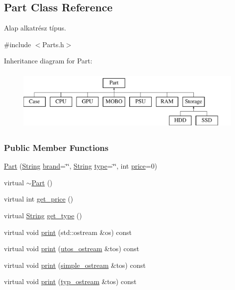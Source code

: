 \subsection{Part Class Reference}
\label{class_part}


Alap alkatrész típus.  




{\ttfamily \#include $<$Parts.\+h$>$}

Inheritance diagram for Part\+:\begin{figure}[H]
\begin{center}
\leavevmode
\includegraphics[height=3.000000cm]{class_part}
\end{center}
\end{figure}
\subsubsection*{Public Member Functions}
\begin{DoxyCompactItemize}
\item 
\mbox{\hyperlink{class_part_aae5224ee782134c4ecb60f23ec38698f}{Part}} (\mbox{\hyperlink{class_string}{String}} \mbox{\hyperlink{class_part_ae06f2fdeb7fbbdb229a7aca151f3e341}{brand}}=\char`\"{}\char`\"{}, \mbox{\hyperlink{class_string}{String}} \mbox{\hyperlink{class_part_a101dbcc5c4b21564df7414c7eb0eae88}{type}}=\char`\"{}\char`\"{}, int \mbox{\hyperlink{class_part_a8e71223aed1da95a974f33d8d6c91bb1}{price}}=0)
\item 
virtual \mbox{\hyperlink{class_part_aaecbb747a7227f7ce3b44caeaf1801c2}{$\sim$\+Part}} ()
\item 
virtual int \mbox{\hyperlink{class_part_a38bcd0481433acc24db7d5f978f2c839}{get\+\_\+price}} ()
\item 
virtual \mbox{\hyperlink{class_string}{String}} \mbox{\hyperlink{class_part_a02569fd3cf6c52b56baceed5d639f487}{get\+\_\+type}} ()
\item 
virtual void \mbox{\hyperlink{class_part_a4fa402b8e8fd4236ff773a7697ab2bc3}{print}} (std\+::ostream \&os) const
\item 
virtual void \mbox{\hyperlink{class_part_a9ecabe44ba3415badf82c6a23617a41e}{print}} (\mbox{\hyperlink{structutos__ostream}{utos\+\_\+ostream}} \&tos) const
\item 
virtual void \mbox{\hyperlink{class_part_aa602d876151b63db72cf8f666847a8cd}{print}} (\mbox{\hyperlink{structsimple__ostream}{simple\+\_\+ostream}} \&tos) const
\item 
virtual void \mbox{\hyperlink{class_part_ab6396030e8b7a724731a8b54bd4942fc}{print}} (\mbox{\hyperlink{structtyp__ostream}{typ\+\_\+ostream}} \&tos) const
\end{DoxyCompactItemize}
